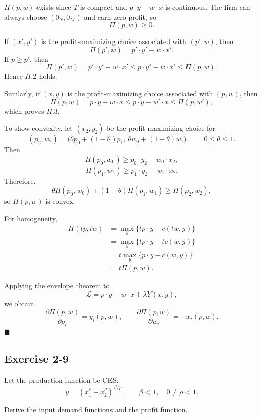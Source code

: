 $\Pi(p,w)$ exists since $T$ is compact and $p\cdot y - w\cdot x$ is continuous.
The firm can always choose $(0_N,0_M)$ and earn zero profit, so
\[
\Pi(p,w)\ge 0.
\]

\medskip

If $(x',y')$ is the profit-maximizing choice associated with $(p',w)$, then
\[
\Pi(p',w)=p'\cdot y' - w\cdot x'.
\]
If $p\ge p'$, then
\[
\Pi(p',w)=p'\cdot y' - w\cdot x'
\le p\cdot y' - w\cdot x'
\le \Pi(p,w).
\]
Hence $\Pi$.2 holds.

\medskip

Similarly, if $(x,y)$ is the profit-maximizing choice associated with $(p,w)$, then
\[
\Pi(p,w)=p\cdot y - w\cdot x
\le p\cdot y - w'\cdot x
\le \Pi(p,w'),
\]
which proves $\Pi$.3.

\medskip

To show convexity, let $(x_2,y_2)$ be the profit-maximizing choice for
\[
(p_2,w_2)=\bigl(\theta p_0+(1-\theta)p_1,\ \theta w_0+(1-\theta)w_1\bigr),
\qquad 0\le \theta \le 1.
\]
Then
\[
\Pi(p_0,w_0)\ge p_0\cdot y_2 - w_0\cdot x_2,
\]
\[
\Pi(p_1,w_1)\ge p_1\cdot y_2 - w_1\cdot x_2.
\]
Therefore,
\[
\theta \Pi(p_0,w_0)+(1-\theta)\Pi(p_1,w_1)
\ge
\Pi(p_2,w_2),
\]
so $\Pi(p,w)$ is convex.

\medskip

For homogeneity,
\[
\begin{aligned}
\Pi(tp,tw)
&=
\max_y \{tp\cdot y - c(tw,y)\}\\
&=
\max_y \{tp\cdot y - t c(w,y)\}\\
&=
t\max_y \{p\cdot y - c(w,y)\}\\
&=
t\Pi(p,w).
\end{aligned}
\]

\medskip

Applying the envelope theorem to
\[
\mathcal{L}=p\cdot y - w\cdot x + \lambda Y(x,y),
\]
we obtain
\[
\frac{\partial \Pi(p,w)}{\partial p_i}=y_i(p,w),
\qquad
\frac{\partial \Pi(p,w)}{\partial w_i}=-x_i(p,w).
\]
\hfill $\blacksquare$



\begin{tcolorbox}[breakable]

\subsection*{Exercise 2-9}

Let the production function be CES:
\[
y = \left(x_1^\rho + x_2^\rho\right)^{\beta/\rho},
\qquad \beta<1,\quad 0\ne \rho<1.
\]

Derive the input demand functions and the profit function.


\end{tcolorbox}



